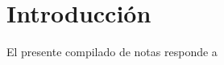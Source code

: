 \documentclass[11pt, notitlepage, 
twoside, %
]{book}
\begin{document}

\tableofcontents
\chapter*{Introducción} %
\par El presente compilado de notas responde a 
%
%
%
%
%
%
%
%
\end{document}
